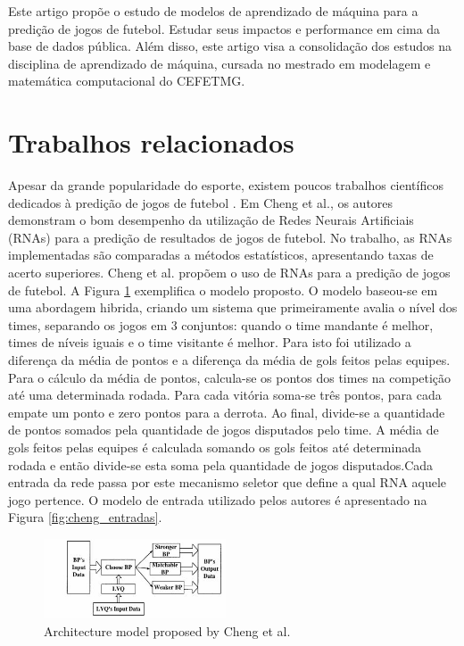 \documentclass{article}
\begin{document}
Este artigo propõe o estudo de modelos de aprendizado de máquina para a predição de jogos de futebol. Estudar seus impactos e performance em cima da base de dados pública. Além disso, este artigo visa a consolidação dos estudos na disciplina de aprendizado de máquina, cursada no mestrado em modelagem e matemática computacional do CEFETMG. 


\section{Trabalhos relacionados}

Apesar da grande popularidade do esporte, existem poucos trabalhos científicos
dedicados à predição de jogos de futebol \cite{aslan2007comparative} . Em Cheng et
al.\cite{cheng2003new}, os autores demonstram o bom desempenho da utilização de Redes Neurais Artificiais (RNAs) para a predição de resultados de jogos de futebol. No trabalho, as RNAs implementadas são comparadas a métodos estatísticos, apresentando taxas de acerto superiores.
Cheng et al. \cite{cheng2003new} propõem o uso de RNAs para a predição de jogos de futebol.
A Figura \ref{fig:cheng_modelo} exemplifica o modelo proposto. O modelo baseou-se em uma abordagem hibrida, criando um sistema que primeiramente avalia o nível dos times, separando os jogos em 3 conjuntos: quando o time mandante é melhor, times de níveis iguais e o time visitante é melhor. Para isto foi utilizado a diferença da média de pontos e a diferença da média de gols feitos pelas equipes. Para o cálculo da média de pontos, calcula-se os pontos dos times na competição até uma determinada rodada. Para cada vitória soma-se três pontos, para cada empate um ponto e zero pontos para a derrota. Ao final, divide-se a quantidade de pontos somados pela quantidade de jogos disputados pelo time. A média de gols feitos pelas equipes é calculada somando os gols feitos até determinada rodada e então divide-se esta soma pela quantidade de jogos disputados.Cada entrada da rede passa por este mecanismo seletor que define a qual RNA aquele jogo pertence. O modelo de entrada utilizado pelos autores é apresentado na Figura \ref{fig:cheng_entradas}.

\begin{figure}[!h]
	\centering
	\includegraphics[width=0.48\textwidth]{./04-figuras/cheng_modelo.JPG}
	\caption{Architecture model proposed by Cheng et al. \cite{cheng2003new}}
	\label{fig:cheng_modelo}
\end{figure}  
\end{document}
